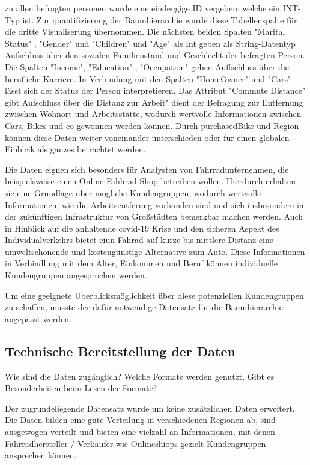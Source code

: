 \documentclass[usegeometry=true]{scrartcl}
\begin{document}
zu allen befragten personen wurde eine eindeugige ID vergeben, welche ein INT-Typ ist. Zur quantifizierung der Baumhierarchie wurde diese Tabellenspalte für die dritte Visualiserung übernommen. Die nächsten beiden Spalten "Marital Status" , "Gender" und "Children" und "Age" als Int geben als String-Datentyp Aufschluss über den sozialen  Familienstand und Geschlecht der befragten Person. Die Spalten "Income", "Education" , "Occupation" geben Auffschluss über die berufliche Karriere. In Verbindung mit den Spalten "HomeOwner" und "Cars" lässt sich der Status der Person interpretieren. Das Attribut "Commute Distance" gibt Aufschluss über die Distanz zur Arbeit" dient der Befragung zur Entfernung zwischen Wohnort und Arbeitsstätte, wodurch wertvolle Informationen zwischen Cars, Bikes und co gewonnen werden können. Durch purchasedBike und Region können diese Daten weiter voneinander unterschieden oder für einen globalen Einblcik als ganzes betrachtet werden. 

Die Daten eignen sich besonders für Analysten von Fahrradunternehmen, die beispielsweise einen Online-Fahhrad-Shop betreiben wollen. Hierdurch erhalten sie eine Grundlage über mögliche Kundengruppen, wodurch wertvolle Informationen, wie die Arbeitsentferung vorhanden sind und sich insbesondere in der zukünftigen Infrastruktur von Großstädten bemerkbar machen werden. Auch in Hinblick auf die anhaltende covid-19 Krise und den sicheren Aspekt des Individualverkehrs bietet eiun Fahrad auf kurze bis mittlere Distanz eine umweltschonende und kostengünstige Alternative zum Auto. 
Diese Informationen in Verbindlung mit dem Alter, Einkommen und Beruf können individuelle Kundengruppen angesprochen werden. 

Um eine geeignete Überblicksmöglichkeit über diese potenziellen Kundengruppen zu schaffen, musste der dafür notwendige Datensatz für die Baumhierarchie angepasst werden. 

\subsection{Technische Bereitstellung der Daten}
Wie sind die Daten zugänglich? Welche Formate werden genutzt. Gibt es Besonderheiten beim Lesen der Formate?



Der zugrundeliegende Datensatz wurde um keine zusätzlichen Daten erweitert. Die Daten bilden eine gute Verteilung in verschiedenen Regionen ab, sind ausgewogen verteilt und bieten eine vielzahl an Informationen, mit denen Fahrradhersteller / Verkäufer wie Onlineshiops gezielt Kundengruppen ansprechen können. 
\end{document}
